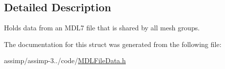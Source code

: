 \subsection{Detailed Description}
Holds data from an M\+D\+L7 file that is shared by all mesh groups. 

The documentation for this struct was generated from the following file\+:\begin{DoxyCompactItemize}
\item 
assimp/assimp-\/3../code/\hyperlink{_m_d_l_file_data_8h}{M\+D\+L\+File\+Data.\+h}\end{DoxyCompactItemize}
